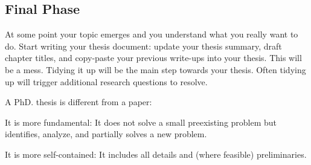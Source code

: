 \documentclass[12pt]{article}
\begin{document}
\subsection{Final Phase}

At some point your topic emerges and you understand what you really want to do.
Start writing your thesis document: update your thesis summary, draft chapter titles, and copy-paste your previous write-ups into your thesis.
This will be a mess.
Tidying it up will be the main step towards your thesis.
Often tidying up will trigger additional research questions to resolve.
\medskip

A PhD. thesis is different from a paper:
\begin{compactitem}
\item It is more fundamental: It does not solve a small preexisting problem but identifies, analyze, and partially solves a new problem.
\item It is more self-contained: It includes all details and (where feasible) preliminaries.
\end{compactitem}
\medskip
\end{document}
